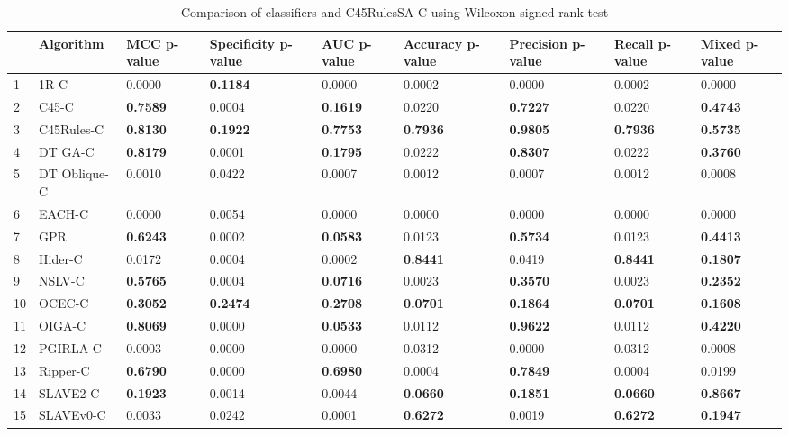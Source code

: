 \begin{table}
\footnotesize
\caption{Comparison of classifiers and C45RulesSA-C using Wilcoxon signed-rank test}
\label{tab:wilcoxon comparison}
\begin{tabular}{lllllllll}
\hline
 & Algorithm & MCC p-value & Specificity p-value & AUC p-value & Accuracy p-value & Precision p-value & Recall p-value & Mixed p-value \\
\hline
1 & 1R-C & 0.0000 & \textbf{0.1184} & 0.0000 & 0.0002 & 0.0000 & 0.0002 & 0.0000 \\
2 & C45-C & \textbf{0.7589} & 0.0004 & \textbf{0.1619} & 0.0220 & \textbf{0.7227} & 0.0220 & \textbf{0.4743} \\
3 & C45Rules-C & \textbf{0.8130} & \textbf{0.1922} & \textbf{0.7753} & \textbf{0.7936} & \textbf{0.9805} & \textbf{0.7936} & \textbf{0.5735} \\
4 & DT GA-C & \textbf{0.8179} & 0.0001 & \textbf{0.1795} & 0.0222 & \textbf{0.8307} & 0.0222 & \textbf{0.3760} \\
5 & DT Oblique-C & 0.0010 & 0.0422 & 0.0007 & 0.0012 & 0.0007 & 0.0012 & 0.0008 \\
6 & EACH-C & 0.0000 & 0.0054 & 0.0000 & 0.0000 & 0.0000 & 0.0000 & 0.0000 \\
7 & GPR & \textbf{0.6243} & 0.0002 & \textbf{0.0583} & 0.0123 & \textbf{0.5734} & 0.0123 & \textbf{0.4413} \\
8 & Hider-C & 0.0172 & 0.0004 & 0.0002 & \textbf{0.8441} & 0.0419 & \textbf{0.8441} & \textbf{0.1807} \\
9 & NSLV-C & \textbf{0.5765} & 0.0004 & \textbf{0.0716} & 0.0023 & \textbf{0.3570} & 0.0023 & \textbf{0.2352} \\
10 & OCEC-C & \textbf{0.3052} & \textbf{0.2474} & \textbf{0.2708} & \textbf{0.0701} & \textbf{0.1864} & \textbf{0.0701} & \textbf{0.1608} \\
11 & OIGA-C & \textbf{0.8069} & 0.0000 & \textbf{0.0533} & 0.0112 & \textbf{0.9622} & 0.0112 & \textbf{0.4220} \\
12 & PGIRLA-C & 0.0003 & 0.0000 & 0.0000 & 0.0312 & 0.0000 & 0.0312 & 0.0008 \\
13 & Ripper-C & \textbf{0.6790} & 0.0000 & \textbf{0.6980} & 0.0004 & \textbf{0.7849} & 0.0004 & 0.0199 \\
14 & SLAVE2-C & \textbf{0.1923} & 0.0014 & 0.0044 & \textbf{0.0660} & \textbf{0.1851} & \textbf{0.0660} & \textbf{0.8667} \\
15 & SLAVEv0-C & 0.0033 & 0.0242 & 0.0001 & \textbf{0.6272} & 0.0019 & \textbf{0.6272} & \textbf{0.1947} \\
\hline
\end{tabular}
\end{table}
